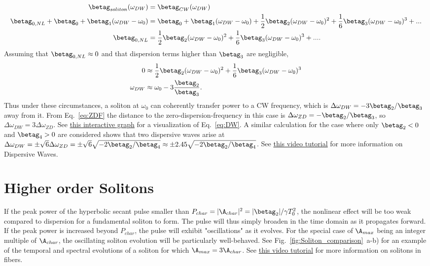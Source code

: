 \begin{align}
\label{eq:DW}
    \betag_{soliton}(\omega_{DW}) &= \betag_{CW}(\omega_{DW})\\
    \betag_{0,NL}+\betag_0+\betag_1(\omega_{DW}-\omega_0) &= \betag_0+\betag_1(\omega_{DW}-\omega_0) + \frac{1}{2}\betag_2(\omega_{DW}-\omega_0)^2+\frac{1}{6}\betag_3(\omega_{DW}-\omega_0)^3+...\\
    \betag_{0,NL}&= \frac{1}{2}\betag_2(\omega_{DW}-\omega_0)^2+\frac{1}{6}\betag_3(\omega_{DW}-\omega_0)^3+....
\end{align}
Assuming that $\betag_{0,NL}\approx 0$ and that dispersion terms higher than $\betag_3$ are negligible, 
\begin{align}
    0&\approx \frac{1}{2}\betag_2(\omega_{DW}-\omega_0)^2+\frac{1}{6}\betag_3(\omega_{DW}-\omega_0)^3\\
    \omega_{DW} &\approx \omega_0-3\frac{\betag_2}{\betag_3}.
\end{align}
Thus under these circumstances, a soliton at $\omega_0$ can coherently transfer power to a CW frequency, which is $\Delta\omega_{DW}=-3\betag_2/\betag_3$ away from it. From Eq.~\ref{eq:ZDF} the distance to the zero-dispersion-frequency in this case is $\Delta\omega_{ZD}=-\betag_2/\betag_3$, so $\Delta\omega_{DW} = 3\Delta\omega_{ZD}$. See \href{https://www.desmos.com/calculator/4zgmcegtni}{this interactive graph} for a visualization of Eq.~\ref{eq:DW}. A similar calculation for the case where only $\betag_2<0$ and $\betag_4>0$ are considered shows that two dispersive waves arise at $\Delta\omega_{DW} = \pm\sqrt{6}\Delta\omega_{ZD} = \pm \sqrt{6} \sqrt{-2\betag_2/\betag_4}\approx \pm 2.45 \sqrt{-2\betag_2/\betag_4}$. See \href{https://www.youtube.com/watch?v=EQNKfDsh2Tk}{this video tutorial} for more information on Dispersive Waves.   



\section{Higher order Solitons}
If the peak power of the hyperbolic secant pulse smaller than $P_{char}=|\A_{char}|^2=|\betag_2|/\gamma T_0^2$, the nonlinear effect will be too weak compared to dispersion for a fundamental soliton to form. The pulse will thus simply broaden in the time domain as it propagates forward. If the peak power is increased beyond $P_{char}$, the pulse will exhibit "oscillations" as it evolves. For the special case of $\A_{max}$ being an integer multiple of $\A_{char}$, the oscillating soliton evolution will be particularly well-behaved. See Fig.~\ref{fig:Soliton_comparison}~a-b) for an example of the temporal and spectral evolutions of a soliton for which $\A_{max}=3\A_{char}$. See \href{https://youtu.be/KAZ7pCQ-x8Y}{this video tutorial} for more information on solitons in fibers. 


